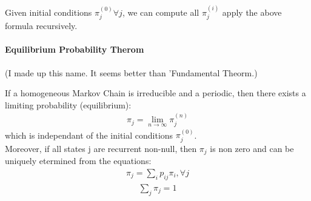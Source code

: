 Given initial conditions $\pi_j^{(0)} \forall j$, we can compute all
$\pi_j^{(i)}$ apply the above formula recursively.

\paragraph{Equilibrium Probability Therom} (I made up this name. It seems better
than 'Fundamental Theorm.)

If a homogeneous Markov Chain is irreducible and a periodic, then there exists a
limiting probability (equilibrium):
\begin{equation*} \begin{split}
	\pi_j = \lim_{n \to \infty} \pi_j^{(n)}
\end{split} \end{equation*}
which is independant of the initial conditions $\pi_j^{(0)}$. \\[0.5cm]

Moreover, if all states j are recurrent non-null, then $\pi_j$ is non zero and
can be uniquely etermined from the equations:
\begin{equation*} \begin{split}
	\pi_j = \sum_i p_{ij} \pi_i , \forall j
\end{split} \end{equation*}
\begin{equation*} \begin{split}
	\sum_j \pi_j = 1
\end{split} \end{equation*}

